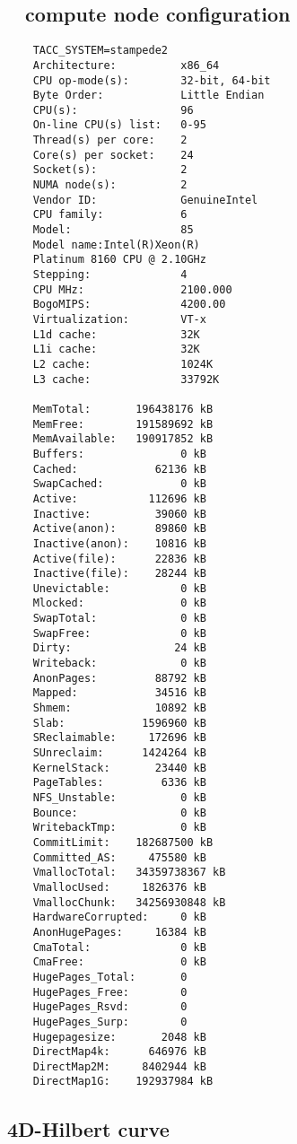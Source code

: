 \subsection{\Stampede~ compute node configuration}
\begin{verbatim}
    TACC_SYSTEM=stampede2
    Architecture:          x86_64
    CPU op-mode(s):        32-bit, 64-bit
    Byte Order:            Little Endian
    CPU(s):                96
    On-line CPU(s) list:   0-95
    Thread(s) per core:    2
    Core(s) per socket:    24
    Socket(s):             2
    NUMA node(s):          2
    Vendor ID:             GenuineIntel
    CPU family:            6
    Model:                 85
    Model name:Intel(R)Xeon(R)
    Platinum 8160 CPU @ 2.10GHz
    Stepping:              4
    CPU MHz:               2100.000
    BogoMIPS:              4200.00
    Virtualization:        VT-x
    L1d cache:             32K
    L1i cache:             32K
    L2 cache:              1024K
    L3 cache:              33792K
    
    MemTotal:       196438176 kB
    MemFree:        191589692 kB
    MemAvailable:   190917852 kB
    Buffers:               0 kB
    Cached:            62136 kB
    SwapCached:            0 kB
    Active:           112696 kB
    Inactive:          39060 kB
    Active(anon):      89860 kB
    Inactive(anon):    10816 kB
    Active(file):      22836 kB
    Inactive(file):    28244 kB
    Unevictable:           0 kB
    Mlocked:               0 kB
    SwapTotal:             0 kB
    SwapFree:              0 kB
    Dirty:                24 kB
    Writeback:             0 kB
    AnonPages:         88792 kB
    Mapped:            34516 kB
    Shmem:             10892 kB
    Slab:            1596960 kB
    SReclaimable:     172696 kB
    SUnreclaim:      1424264 kB
    KernelStack:       23440 kB
    PageTables:         6336 kB
    NFS_Unstable:          0 kB
    Bounce:                0 kB
    WritebackTmp:          0 kB
    CommitLimit:    182687500 kB
    Committed_AS:     475580 kB
    VmallocTotal:   34359738367 kB
    VmallocUsed:     1826376 kB
    VmallocChunk:   34256930848 kB
    HardwareCorrupted:     0 kB
    AnonHugePages:     16384 kB
    CmaTotal:              0 kB
    CmaFree:               0 kB
    HugePages_Total:       0
    HugePages_Free:        0
    HugePages_Rsvd:        0
    HugePages_Surp:        0
    Hugepagesize:       2048 kB
    DirectMap4k:      646976 kB
    DirectMap2M:     8402944 kB
    DirectMap1G:    192937984 kB
\end{verbatim}


\subsection{4D-Hilbert curve}
\label{subsec:4d_hilbert}
